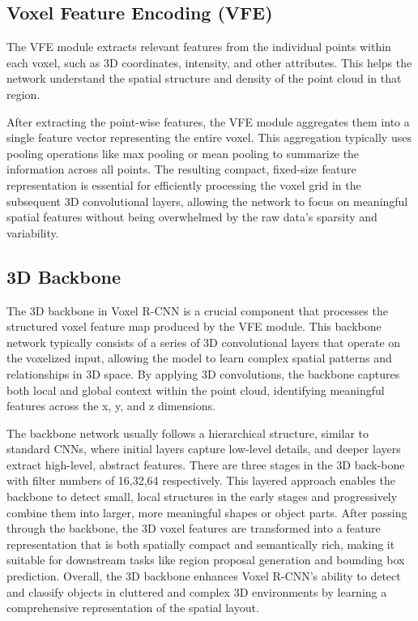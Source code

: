 \subsection{Voxel Feature Encoding (VFE)}
The VFE module extracts relevant features from the individual points within each voxel, such as 3D coordinates, intensity, and other attributes. This helps the network understand the spatial structure and density of the point cloud in that region.

After extracting the point-wise features, the VFE module aggregates them into a single feature vector representing the entire voxel. This aggregation typically uses pooling operations like max pooling or mean pooling to summarize the information across all points. The resulting compact, fixed-size feature representation is essential for efficiently processing the voxel grid in the subsequent 3D convolutional layers, allowing the network to focus on meaningful spatial features without being overwhelmed by the raw data's sparsity and variability.

\subsection{3D Backbone}
The 3D backbone in Voxel R-CNN is a crucial component that processes the structured voxel feature map produced by the VFE module. This backbone network typically consists of a series of 3D convolutional layers that operate on the voxelized input, allowing the model to learn complex spatial patterns and relationships in 3D space. By applying 3D convolutions, the backbone captures both local and global context within the point cloud, identifying meaningful features across the x, y, and z dimensions. 

The backbone network usually follows a hierarchical structure, similar to standard CNNs, where initial layers capture low-level details, and deeper layers extract high-level, abstract features. There are three stages in the 3D back-bone with filter numbers of 16,32,64 respectively. This layered approach enables the backbone to detect small, local structures in the early stages and progressively combine them into larger, more meaningful shapes or object parts. After passing through the backbone, the 3D voxel features are transformed into a feature representation that is both spatially compact and semantically rich, making it suitable for downstream tasks like region proposal generation and bounding box prediction. Overall, the 3D backbone enhances Voxel R-CNN's ability to detect and classify objects in cluttered and complex 3D environments by learning a comprehensive representation of the spatial layout.

